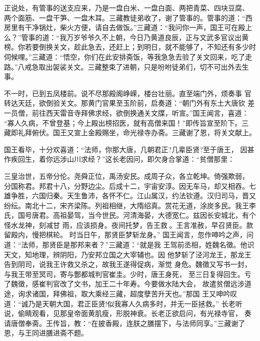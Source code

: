 正说处，有管事的送支应来，乃是一盘白米、一盘白面、两把青菜、四块豆腐、
两个面筋、一盘干笋、一盘木耳。三藏教徒弟收了，谢了管事的。管事的道：“西
房里有干净锅灶，柴火方便，请自去做饭。”三藏道：“我问你一声，国王可在殿上
么？”管事的道：“我万岁爷爷久不上朝，今日乃黄道良辰，正与文武多官议出黄
榜。你若要倒换关文，趁此急去，还赶上；到明日，就不能够了，不知还有多少时
伺候哩。”三藏道：“悟空，你们在此安排斋饭，等我急急去验了关文回来，吃了走
路。”八戒急取出袈裟关文。三藏整束了进朝，只是吩咐徒弟们，切不可出外去生
事。

不一时，已到五凤楼前。说不尽那殿阁峥嵘，楼台壮丽。直至端门外，烦奏事
官转达天廷，欲倒验关文。那黄门官果至玉阶前，启奏道：“朝门外有东土大唐钦
差一员僧，前往西天雷音寺拜佛求经，欲倒换通关文牒，听宣。”国王闻言，喜道：
“寡人久病，不曾登基；今上殿出榜招医，就有高僧来国！”即传旨宣至阶下。三
藏即礼拜俯伏。国王又宣上金殿赐坐，命光禄寺办斋。三藏谢了恩，将关文献上。

国王看毕，十分欢喜道：“法师，你那大唐，几朝君正?几辈臣贤?至于唐王，
因甚作疾回生，着你远涉山川求经？”这长老因问，即欠身合掌道：“贫僧那里：

三皇治世，五帝分伦。尧舜正位，禹汤安民。成周子众，各立乾坤。倚强欺弱，
分国称君。邦君十八，分野边尘。后成十二，宇宙安淳。因无车马，却又相吞。七
雄争胜，六国归秦。天生鲁沛，各怀不仁。江山属汉，约法钦遵。汉归司马，晋又
纷纭。南北十二，宋齐梁陈。列祖相继，大隋绍真。赏花无道，涂炭多民。我王李
氏，国号唐君。高祖晏驾，当今世民。河清海晏，大德宽仁。兹因长安城北，有个
怪水龙神，刻减甘
雨，应该损身。夜间托梦，告王救。王言准赦，早召贤臣。款留殿内，慢把棋轮。
时当日午，那贤臣梦斩龙身。”
国王闻言，忽作呻吟之声，问道：“法师，那贤臣是那邦来者？”三藏道：“就是我
王驾前丞相，姓魏名徵。他识天文，知地理，辨阴阳，乃安邦立国之大宰辅也。因
他梦斩了泾河龙王，那龙王告到阴司，说我王许救又杀之，故我王遂得促病，渐觉
身危。魏徵又写书一封，与我王带至冥司，寄与酆都城判官崔圭。少时，唐王身死，
至三日复得回生。亏了魏徵，感崔判官改了文书，加王二十年寿。今要做水陆大会，
故遣贫僧远涉道途，询求诸国，拜佛祖，取大乘经三藏，超度孽苦升天也。”那国
王又呻吟叹道：“诚乃是天朝大国，君正臣贤!似我寡人久病多时，并无一臣拯救。”
长老听说，偷睛观看，见那皇帝面黄肌瘦，形脱神衰。长老正欲启问，有光禄寺官，
奏请唐僧奉斋。王传旨，教：“在披香殿，连朕之膳摆下，与法师同享。”三藏谢了
恩，与王同进膳进斋不题。

